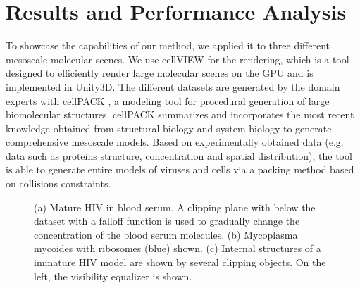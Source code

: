 \section{Results and Performance Analysis}

To showcase the capabilities of our method, we applied it to three different mesoscale molecular scenes. 
We use cellVIEW \cite{muzic15} for the rendering, which is a tool designed to efficiently render large molecular scenes on the GPU and is implemented in Unity3D. 
The different datasets are generated by the domain experts with cellPACK \cite{cellpack}, a modeling tool for procedural generation of large biomolecular structures.
cellPACK summarizes and incorporates the most recent knowledge obtained from structural biology and system biology to generate comprehensive mesoscale models. Based on experimentally obtained data (e.g. data such as proteins structure, concentration and spatial distribution), the tool is able to generate entire models of viruses and cells via a packing method based on collisions constraints.


\begin{figure}[t]
\centering
{}
\caption{\label{fig:res:res}
(a) Mature HIV in blood serum. A clipping plane with below the dataset with a falloff function is used to gradually change the concentration of the blood serum molecules.
(b) Mycoplasma mycoides with ribosomes (blue) shown. 
(c) Internal structures of a immature HIV model are shown by several clipping objects. On the left, the visibility equalizer is shown.}
\vspace{-3mm}
\end{figure}


